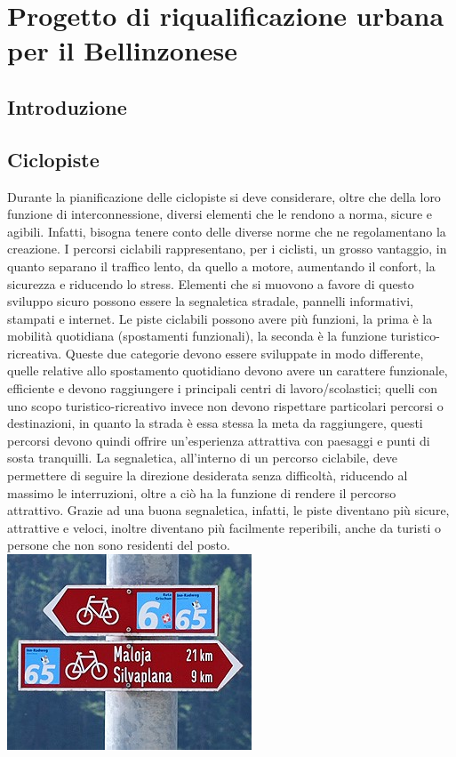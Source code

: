 \section{Progetto di riqualificazione urbana per il Bellinzonese}

\subsection{Introduzione}

\subsection{Ciclopiste}
Durante la pianificazione delle ciclopiste si deve considerare, oltre che della loro funzione di interconnessione, diversi elementi che le rendono a norma, sicure e agibili. Infatti, bisogna tenere conto delle diverse norme che ne regolamentano la creazione. I percorsi ciclabili rappresentano, per i ciclisti, un grosso vantaggio, in quanto separano il traffico lento, da quello a motore, aumentando il confort, la sicurezza e riducendo lo stress. Elementi che si muovono a favore di questo sviluppo sicuro possono essere la segnaletica stradale, pannelli informativi, stampati e internet. Le piste ciclabili possono avere più funzioni, la prima è la mobilità quotidiana (spostamenti funzionali), la seconda è la funzione turistico-ricreativa. Queste due categorie devono essere sviluppate in modo differente, quelle relative allo spostamento quotidiano devono avere un carattere funzionale, efficiente e devono raggiungere i principali centri di lavoro/scolastici; quelli con uno scopo turistico-ricreativo invece non devono rispettare particolari percorsi o destinazioni, in quanto la strada è essa stessa la meta da raggiungere, questi percorsi devono quindi offrire un’esperienza attrattiva con paesaggi e punti di sosta tranquilli. 
La segnaletica, all’interno di un percorso ciclabile, deve permettere di seguire la direzione desiderata senza difficoltà, riducendo al massimo le interruzioni, oltre a ciò ha la funzione di rendere il percorso attrattivo. Grazie ad una buona segnaletica, infatti, le piste diventano più sicure, attrattive e veloci, inoltre diventano più facilmente reperibili, anche da turisti o persone che non sono residenti del posto. 
\\
\includegraphics[scale=1]{Capitoli/cartelol.jpg}
